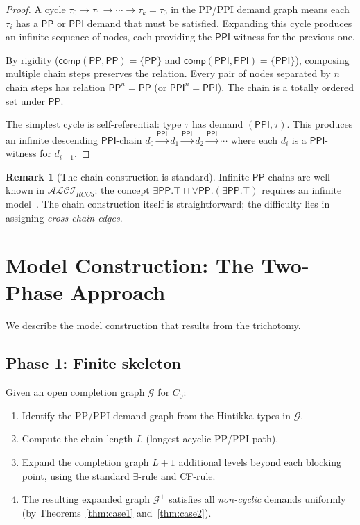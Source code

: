 \documentclass[a4paper,11pt]{article}
\theoremstyle{definition}
\newtheorem{remark}[theorem]{Remark}
\newcommand{\ALCIRCC}[1]{\ensuremath{\mathcal{ALCI}_{\mathit{RCC#1}}}}
\newcommand{\PP}{\ensuremath{\mathsf{PP}}}
\newcommand{\PPI}{\ensuremath{\mathsf{PPI}}}
\newcommand{\comp}{\ensuremath{\mathsf{comp}}}
\begin{document}
\begin{proof}
A cycle $\tau_0 \to \tau_1 \to \cdots \to \tau_k = \tau_0$ in
the PP/PPI demand graph means each $\tau_i$ has a $\PP$ or $\PPI$
demand that must be satisfied.  Expanding this cycle produces an
infinite sequence of nodes, each providing the $\PPI$-witness for
the previous one.

By rigidity ($\comp(\PP, \PP) = \{\PP\}$ and
$\comp(\PPI, \PPI) = \{\PPI\}$), composing multiple chain steps
preserves the relation.  Every pair of nodes separated by $n$
chain steps has relation $\PP^n = \PP$ (or $\PPI^n = \PPI$).
The chain is a totally ordered set under $\PP$.

The simplest cycle is self-referential: type $\tau$ has demand
$(\PPI, \tau)$.  This produces an infinite descending $\PPI$-chain
$d_0 \stackrel{\PPI}{\to} d_1 \stackrel{\PPI}{\to} d_2
\stackrel{\PPI}{\to} \cdots$ where each $d_i$ is a $\PPI$-witness
for $d_{i-1}$.
\end{proof}

\begin{remark}[The chain construction is standard]
Infinite $\PP$-chains are well-known in $\ALCIRCC{5}$: the concept
$\exists \PP.\top \sqcap \forall \PP.(\exists \PP.\top)$ requires
an infinite model~\cite{Wessel2003}.  The chain construction itself
is straightforward; the difficulty lies in assigning \emph{cross-chain
edges}.
\end{remark}


\section{Model Construction: The Two-Phase Approach}
\label{sec:construction}

We describe the model construction that results from the trichotomy.

\subsection{Phase 1: Finite skeleton}

Given an open completion graph $\mathcal{G}$ for $C_0$:

\begin{enumerate}[nosep]
  \item Identify the PP/PPI demand graph from the Hintikka types
    in $\mathcal{G}$.
  \item Compute the chain length $L$ (longest acyclic PP/PPI path).
  \item Expand the completion graph $L + 1$ additional levels
    beyond each blocking point, using the standard $\exists$-rule
    and CF-rule.
  \item The resulting expanded graph $\mathcal{G}^+$ satisfies
    all \emph{non-cyclic} demands uniformly (by Theorems~\ref{thm:case1}
    and~\ref{thm:case2}).
\end{enumerate}
\end{document}

